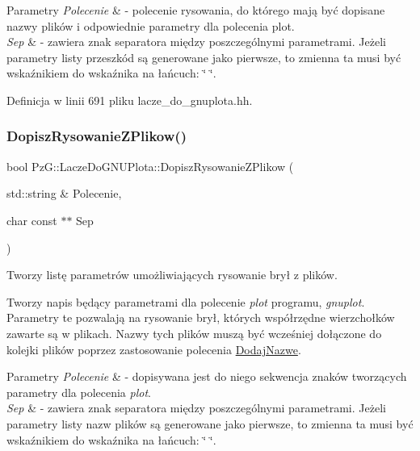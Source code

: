 \begin{DoxyParams}{Parametry}
{\em Polecenie} & -\/ polecenie rysowania, do którego mają być dopisane nazwy plików i odpowiednie parametry dla polecenia plot. \\
\hline
{\em Sep} & -\/ zawiera znak separatora między poszczególnymi parametrami. Jeżeli parametry listy przeszkód są generowane jako pierwsze, to zmienna ta musi być wskaźnikiem do wskaźnika na łańcuch\+: \char`\"{} \char`\"{}. \\
\hline
\end{DoxyParams}


Definicja w linii 691 pliku lacze\+\_\+do\+\_\+gnuplota.\+hh.

\mbox{\label{class_pz_g_1_1_lacze_do_g_n_u_plota_ad3d7607946b82aa941d786dcd086d27e}} 
\subsubsection{\texorpdfstring{Dopisz\+Rysowanie\+Z\+Plikow()}{DopiszRysowanieZPlikow()}}
{\footnotesize\ttfamily bool Pz\+G\+::\+Lacze\+Do\+G\+N\+U\+Plota\+::\+Dopisz\+Rysowanie\+Z\+Plikow (\begin{DoxyParamCaption}\item[{std\+::string \&}]{Polecenie,  }\item[{char const $\ast$$\ast$}]{Sep }\end{DoxyParamCaption})}



Tworzy listę parametrów umożliwiających rysowanie brył z plików. 

Tworzy napis będący parametrami dla polecenie {\itshape plot} programu, {\itshape gnuplot}. Parametry te pozwalają na rysowanie brył, których współrzędne wierzchołków zawarte są w plikach. Nazwy tych plików muszą być wcześniej dołączone do kolejki plików poprzez zastosowanie polecenia \hyperlink{}{Dodaj\+Nazwe}.


\begin{DoxyParams}{Parametry}
{\em Polecenie} & -\/ dopisywana jest do niego sekwencja znaków tworzących parametry dla polecenia {\itshape plot}. \\
\hline
{\em Sep} & -\/ zawiera znak separatora między poszczególnymi parametrami. Jeżeli parametry listy nazw plików są generowane jako pierwsze, to zmienna ta musi być wskaźnikiem do wskaźnika na łańcuch\+: \char`\"{} \char`\"{}. \\
\hline
\end{DoxyParams}

